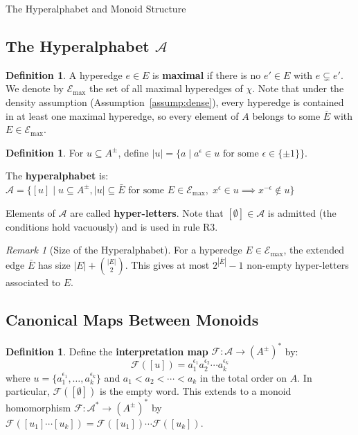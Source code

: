 \documentclass{article}
\theoremstyle{definition}
\newtheorem{definition}[theorem]{Definition}
\theoremstyle{remark}
\newtheorem{remark}[theorem]{Remark}
\theoremstyle{theorem}
\theoremstyle{definition}
\begin{document}
\begin{section}{The Hyperalphabet and Monoid Structure}

\subsection{The Hyperalphabet $\mathcal{A}$}

\begin{definition}
A hyperedge $e \in E$ is \textbf{maximal} if there is no $e' \in E$ with
$e \subsetneq e'$. We denote by $\mathcal{E}_{\max}$ the set of all maximal
hyperedges of $\chi$. Note that under the density assumption
(Assumption~\ref{assump:dense}), every hyperedge is contained in at least
one maximal hyperedge, so every element of $A$ belongs to some
$\bar{E}$ with $E \in \mathcal{E}_{\max}$.
\end{definition}

\begin{definition}
For $u\subseteq A^{\pm}$, define $|u| = \{ a \mid a^{\epsilon} \in u \text{ for some } \epsilon \in \{\pm 1\}\}$.

The \textbf{hyperalphabet} is:
$\mathcal{A}=\{ [u] \mid u\subseteq A^{\pm}, |u|\subseteq \bar{E} \text{ for some } E \in \mathcal{E}_{\max}, \; x^{\epsilon}\in u \implies x^{-\epsilon}\not\in u \}$

Elements of $\mathcal{A}$ are called \textbf{hyper-letters}. Note that
$[\emptyset] \in \mathcal{A}$ is admitted (the conditions hold vacuously)
and is used in rule R3.
\end{definition}

\begin{remark}[Size of the Hyperalphabet]
For a hyperedge $E \in \mathcal{E}_{\max}$, the extended edge $\bar{E}$ has size $|E| + \binom{|E|}{2}$. This gives at most $2^{|\bar{E}|} - 1$ non-empty hyper-letters associated to $E$.
\end{remark}

\subsection{Canonical Maps Between Monoids}

\begin{definition}
Define the \textbf{interpretation map} $\mathcal{F}: \mathcal{A} \to (A^{\pm})^*$ by:
$$\mathcal{F}([u]) = a_1^{\epsilon_1} a_2^{\epsilon_2} \cdots a_k^{\epsilon_k}$$
where $u = \{a_1^{\epsilon_1}, \ldots, a_k^{\epsilon_k}\}$ and $a_1 < a_2 < \cdots < a_k$ in the total order on $A$. In particular, $\mathcal{F}([\emptyset])$ is the empty word. This extends to a monoid homomorphism $\mathcal{F}: \mathcal{A}^* \to (A^{\pm})^*$ by $\mathcal{F}([u_1]\cdots[u_k]) = \mathcal{F}([u_1])\cdots\mathcal{F}([u_k])$.
\end{definition}


\end{section}
\end{document}
